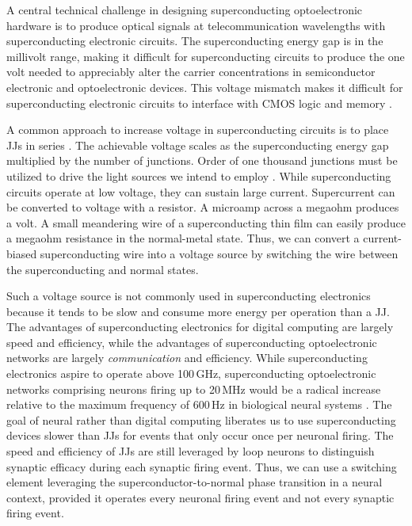 \documentclass[aip,amsmath,amssymb,reprint,nofootinbib]{revtex4-1}
\begin{document}
A central technical challenge in designing superconducting optoelectronic hardware is to produce optical signals at telecommunication wavelengths with superconducting electronic circuits. The superconducting energy gap \cite{ti1996} is in the millivolt range, making it difficult for superconducting circuits to produce the one volt needed to appreciably alter the carrier concentrations in semiconductor electronic and optoelectronic devices. This voltage mismatch makes it difficult for superconducting electronic circuits to interface with CMOS logic \cite{ka1999} and memory \cite{vafe2002}. 

A common approach to increase voltage in superconducting circuits is to place JJs in series \cite{suin1988}. The achievable voltage scales as the superconducting energy gap multiplied by the number of junctions. Order of one thousand junctions must be utilized to drive the light sources we intend to employ \cite{shbu2017,buch2017}. While superconducting circuits operate at low voltage, they can sustain large current. Supercurrent can be converted to voltage with a resistor. A microamp across a megaohm produces a volt. A small meandering wire of a superconducting thin film can easily produce a megaohm resistance in the normal-metal state. Thus, we can convert a current-biased superconducting wire into a voltage source by switching the wire between the superconducting and normal states.

Such a voltage source is not commonly used in superconducting electronics because it tends to be slow and consume more energy per operation than a JJ. The advantages of superconducting electronics for digital computing are largely speed and efficiency, while the advantages of superconducting optoelectronic networks are largely \textit{communication} and efficiency. While superconducting electronics aspire to operate above 100\,GHz, superconducting optoelectronic networks comprising neurons firing up to 20\,MHz would be a radical increase relative to the maximum frequency of 600\,Hz in biological neural systems \cite{stsa2000,budr2004,bu2006}. The goal of neural rather than digital computing liberates us to use superconducting devices slower than JJs for events that only occur once per neuronal firing. The speed and efficiency of JJs are still leveraged by loop neurons to distinguish synaptic efficacy during each synaptic firing event. Thus, we can use a switching element leveraging the superconductor-to-normal phase transition in a neural context, provided it operates every neuronal firing event and not every synaptic firing event. 
\end{document}
